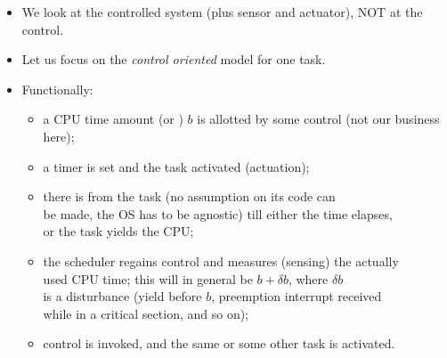 \begin{frame}
\myPause
 \begin{itemize}[<+-| alert@+>]
 \item We look at the controlled system (plus sensor and actuator), NOT at the control.
 \item Let us focus on the \emph{control oriented} model for one task.
 \item Functionally:
       \begin{itemize}[<+-| alert@+>]
       \item a CPU time amount (or ) $b$ is allotted by some control (not our business here);
       \item a timer is set and the task activated (actuation);
       \item there is  from the task (no assumption on its code can\\
             be made, the OS has to be agnostic) till either the time elapses,\\
             or the task yields the CPU;
       \item the scheduler regains control and measures (sensing) the actually\\
             used CPU time; this will in general be $b+\delta b$, where $\delta b$\\
             is a disturbance (yield before $b$, preemption interrupt received\\
             while in a critical section, and so on);
       \item control is invoked, and the same or some other task is activated.
       \end{itemize}
 \end{itemize}
\end{frame}

